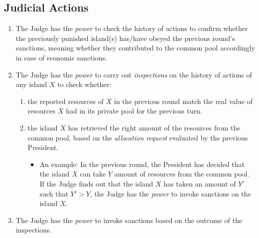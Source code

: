 \subsection{Judicial Actions}
\begin{enumerate}
    \item The Judge has the \emph{power} to check the history of actions to confirm whether the previously punished island(s) has/have obeyed the previous round's sanctions, meaning whether they contributed to the common pool accordingly in case of economic sanctions.
    \item The Judge has the \emph{power} to carry out \emph{inspections} on the history of actions of any island $X$ to check whether:
        \begin{enumerate}
        \item the reported resources of $X$ in the previous round match the real value of resources $X$ had in its private pool for the previous turn.
        \item the island $X$ has retrieved the right amount of the resources from the common pool, based on the \emph{allocation request} evaluated by the previous President.
            \begin{itemize}
            \item An example: In the previous round, the President has decided that the island $X$ can take $Y$ amount of resources from the common pool. If the Judge finds out that the island $X$ has taken an amount of $Y'$ such that $Y' > Y$, the Judge has the \emph{power} to invoke sanctions on the island $X$.

            \end{itemize}
        \end{enumerate}
    \item The Judge has the \emph{power} to invoke sanctions based on the outcome of the inspections.
\end{enumerate}
